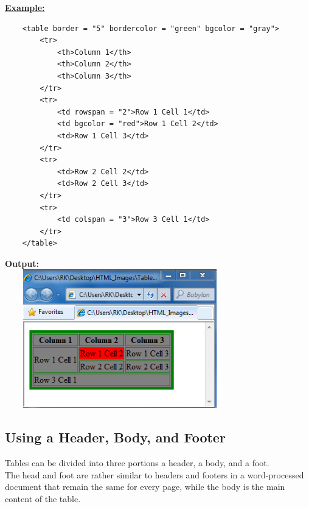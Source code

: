 \documentclass[11pt,a4paper]{article}
\begin{document}
\underline{\textbf{Example:}}
\begin{verbatim}
    <table border = "5" bordercolor = "green" bgcolor = "gray">
        <tr>
            <th>Column 1</th>
            <th>Column 2</th>
            <th>Column 3</th>
        </tr>
        <tr>
            <td rowspan = "2">Row 1 Cell 1</td>
            <td bgcolor = "red">Row 1 Cell 2</td>
            <td>Row 1 Cell 3</td>
        </tr>
        <tr>
            <td>Row 2 Cell 2</td>
            <td>Row 2 Cell 3</td>
        </tr>
        <tr>
            <td colspan = "3">Row 3 Cell 1</td>
        </tr>
    </table>
\end{verbatim}
\textbf{Output:}\\
\includegraphics[height = 60mm, width = 100mm]{Table7.png}

\subsection*{Using a Header, Body, and Footer}
Tables can be divided into three portions a header, a body, and a foot. \\
The head and foot are rather similar to headers and footers in a word-processed document that remain the same for every page, while the body is the main content of the table.
\end{document}
